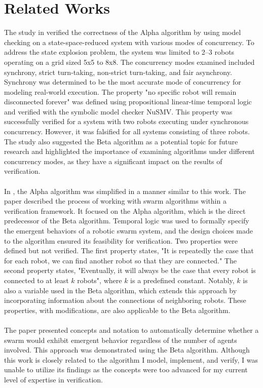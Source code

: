 \section{Related Works}
The study in \cite{Dixon2011} verified the correctness of the Alpha algorithm by using model checking on a state-space-reduced system with various modes of concurrency. To address the state explosion problem, the system was limited to 2–3 robots operating on a grid sized 5x5 to 8x8. The concurrency modes examined included synchrony, strict turn-taking, non-strict turn-taking, and fair asynchrony. Synchrony was determined to be the most accurate mode of concurrency for modeling real-world execution. The property "no specific robot will remain disconnected forever" was defined using propositional linear-time temporal logic and verified with the symbolic model checker NuSMV. This property was successfully verified for a system with two robots executing under synchronous concurrency. However, it was falsified for all systems consisting of three robots. The study also suggested the Beta algorithm as a potential topic for future research and highlighted the importance of examining algorithms under different concurrency modes, as they have a significant impact on the results of verification.
\\\\
In \cite{Winfield2005}, the Alpha algorithm was simplified in a manner similar to this work. The paper described the process of working with swarm algorithms within a verification framework. It focused on the Alpha algorithm, which is the direct predecessor of the Beta algorithm. Temporal logic was used to formally specify the emergent behaviors of a robotic swarm system, and the design choices made to the algorithm ensured its feasibility for verification. Two properties were defined but not verified. The first property states, "It is repeatedly the case that for each robot, we can find another robot so that they are connected." The second property states, "Eventually, it will always be the case that every robot is connected to at least $k$ robots", where $k$ is a predefined constant. Notably, $k$ is also a variable used in the Beta algorithm, which extends this approach by incorporating information about the connections of neighboring robots. These properties, with modifications, are also applicable to the Beta algorithm.
\\\\
The paper \cite{Kouvaros2015} presented concepts and notation to automatically determine whether a swarm would exhibit emergent behavior regardless of the number of agents involved. This approach was demonstrated using the Beta algorithm. Although this work is closely related to the algorithm I model, implement, and verify, I was unable to utilize its findings as the concepts were too advanced for my current level of expertise in verification.